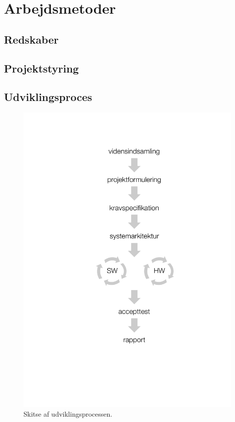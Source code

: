\chapter{Arbejdsmetoder}\label{kapitel_Arbejdsmetoder}


\section{Redskaber}


\section{Projektstyring}



\section{Udviklingsproces}\label{sect_Udvikl}


\begin{figure}[H]
    \centering
    \includegraphics[scale=0.4]{figurer/r/AgileMetode}
    \caption{Skitse af udviklingsprocessen.}
    \label{figAgil}
\end{figure}
